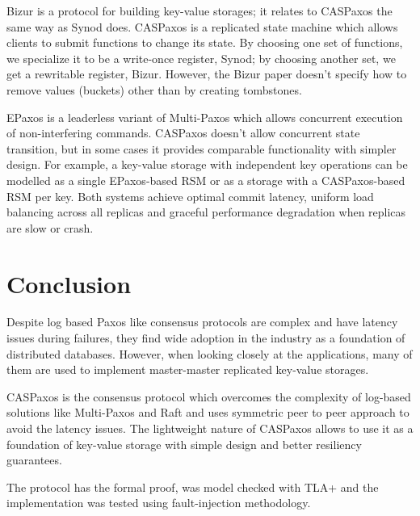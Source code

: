 \documentclass[12pt]{article}
\theoremstyle{definition}
\begin{document}
Bizur\cite{bizur} is a protocol for building key-value storages; it relates to CASPaxos the same way as Synod does. CASPaxos is a replicated state machine which allows clients to submit functions to change its state. By choosing one set of functions, we specialize it to be a write-once register, Synod; by choosing another set, we get a rewritable register, Bizur. However, the Bizur paper doesn't specify how to remove values (buckets) other than by creating tombstones.

EPaxos\cite{epaxos} is a leaderless variant of Multi-Paxos which allows concurrent execution of non-interfering commands. CASPaxos doesn't allow concurrent state transition, but in some cases it provides comparable functionality with simpler design. For example, a key-value storage with independent key operations can be modelled as a single EPaxos-based RSM or as a storage with a CASPaxos-based RSM per key. Both systems achieve optimal commit latency, uniform load balancing across all replicas and graceful performance degradation when replicas are slow or crash.

\section{Conclusion}

Despite log based Paxos like consensus protocols are complex and have latency issues during failures, they find wide adoption in the industry as a foundation of distributed databases. However, when looking closely at the applications, many of them are used to implement master-master replicated key-value storages.

CASPaxos is the consensus protocol which overcomes the complexity of log-based solutions like Multi-Paxos and Raft and uses symmetric peer to peer approach to avoid the latency issues. The lightweight nature of CASPaxos allows to use it as a foundation of key-value storage with simple design and better resiliency guarantees.

The protocol has the formal proof, was model checked with TLA+ and the implementation was tested using fault-injection methodology.
\end{document}
